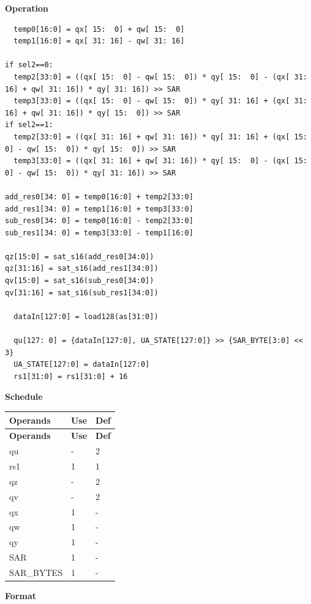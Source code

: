 \textbf{Operation}
\begin{lstlisting}
  temp0[16:0] = qx[ 15:  0] + qw[ 15:  0]
  temp1[16:0] = qx[ 31: 16] - qw[ 31: 16]

if sel2==0:
  temp2[33:0] = ((qx[ 15:  0] - qw[ 15:  0]) * qy[ 15:  0] - (qx[ 31: 16] + qw[ 31: 16]) * qy[ 31: 16]) >> SAR
  temp3[33:0] = ((qx[ 15:  0] - qw[ 15:  0]) * qy[ 31: 16] + (qx[ 31: 16] + qw[ 31: 16]) * qy[ 15:  0]) >> SAR
if sel2==1:
  temp2[33:0] = ((qx[ 31: 16] + qw[ 31: 16]) * qy[ 31: 16] + (qx[ 15:  0] - qw[ 15:  0]) * qy[ 15:  0]) >> SAR
  temp3[33:0] = ((qx[ 31: 16] + qw[ 31: 16]) * qy[ 15:  0] - (qx[ 15:  0] - qw[ 15:  0]) * qy[ 31: 16]) >> SAR

add_res0[34: 0] = temp0[16:0] + temp2[33:0]
add_res1[34: 0] = temp1[16:0] + temp3[33:0]
sub_res0[34: 0] = temp0[16:0] - temp2[33:0]
sub_res1[34: 0] = temp3[33:0] - temp1[16:0]

qz[15:0] = sat_s16(add_res0[34:0])
qz[31:16] = sat_s16(add_res1[34:0])
qv[15:0] = sat_s16(sub_res0[34:0])
qv[31:16] = sat_s16(sub_res1[34:0])

  dataIn[127:0] = load128(as[31:0])

  qu[127: 0] = {dataIn[127:0], UA_STATE[127:0]} >> {SAR_BYTE[3:0] << 3}
  UA_STATE[127:0] = dataIn[127:0]
  rs1[31:0] = rs1[31:0] + 16
\end{lstlisting}

\textbf{Schedule}\\
\begin{longtable}[c]{|l|l|l|}
    \hline
    \rowcolor{lightgray}
    \textbf{Operands} & \textbf{Use} & \textbf{Def} \\\hline
    \endfirsthead
    \hline
    \rowcolor{lightgray}
     \textbf{Operands} & \textbf{Use} & \textbf{Def} \\\hline
    \endhead
    \hline
    \endfoot

  qu & - & 2 \\\hline
  rs1 & 1 & 1 \\\hline
  qz & - & 2 \\\hline
  qv & - & 2 \\\hline
  qx & 1 & - \\\hline
  qw & 1 & - \\\hline
  qy & 1 & - \\\hline
  SAR & 1 & - \\\hline
  SAR\_BYTES & 1 & -

\end{longtable}

\textbf{Format}\\

